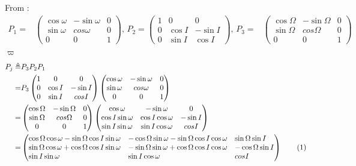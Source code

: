 \documentclass[]{article}
\newcommand\numberthis{\addtocounter{equation}{1}\tag{\theequation}}
\begin{document}
From  \cite[(2.119) and (2.120)]{ssd}:
\begin{align*}
P_1 =& \begin{pmatrix}
\cos \omega & - \sin \omega & 0\\
\sin \omega & cos \omega & 0\\
0 & 0  & 1
\end{pmatrix}
\text{, }
P_2 = \begin{pmatrix}
1 & 0 & 0\\
0 & \cos I & - \sin I\\
0 & \sin I & \cos I
\end{pmatrix}
\text{, }
P_3 =& \begin{pmatrix}
\cos \Omega & - \sin \Omega & 0\\
\sin \Omega & cos \Omega & 0\\
0 & 0  & 1
\end{pmatrix}
\end{align*}
$\varpi$
\begin{align*}
P_j \triangleq& P_3 P_2 P_1\\
 =& P_3 \begin{pmatrix}
1 & 0 & 0\\
0 & \cos I & - \sin I\\
0 & \sin I & cos I
\end{pmatrix}
\begin{pmatrix}
\cos \omega & - \sin \omega & 0\\
\sin \omega & cos \omega & 0\\
0 & 0  & 1
\end{pmatrix} \\
=& \begin{pmatrix}
\cos \Omega & - \sin \Omega & 0\\
\sin \Omega & cos \Omega & 0\\
0 & 0  & 1
\end{pmatrix}
\begin{pmatrix}
\cos \omega & -\sin \omega & 0\\
\cos I \sin \omega & \cos I \cos \omega & - \sin I\\
\sin I \sin \omega & \sin I \cos \omega & cos I
\end{pmatrix}\\
=&\begin{pmatrix*}[l]
\cos \Omega \cos \omega - \sin \Omega \cos I \sin \omega&-\cos \Omega \sin \omega - \sin \Omega \cos I \cos \omega& \sin \Omega \sin I\\
\sin \Omega \cos \omega + \cos \Omega \cos I \sin \omega& - \sin \Omega \sin \omega + \cos \Omega \cos I \cos \omega& - \cos \Omega \sin I \\
\sin I \sin \omega & \sin I \cos \omega & cos I
\end{pmatrix*}\numberthis \label{eq:Pj}
\end{align*}
\end{document}
